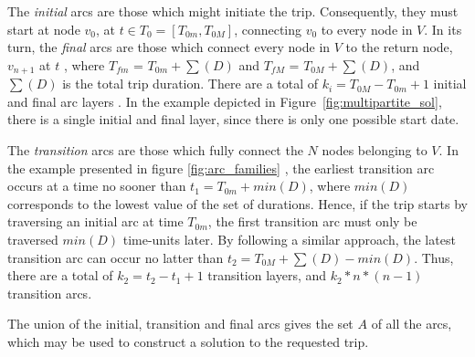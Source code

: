 The \textit{initial} arcs are those which might initiate the trip. Consequently,
they must start at node $v_0$, at $t \in T_0 = [T_{0m}, T_{0M}]$,
connecting $v_0$ to every node in $V$. In its turn, the \textit{final} arcs are those which connect every node in $V$ to
the return node, $v_{n+1}$ at $t$ \in [$T_{fm}$, $T_{fM}$], where $T_{fm}$ =
$T_{0m} + \sum(D)$ and $T_{fM}$ = $T_{0M} + \sum(D)$, and $\sum(D)$
is the total trip duration. There are a total of $k_i = T_{0M} -
T_{0m} + 1$ initial and final arc layers . In the example
depicted in Figure~\ref{fig:multipartite_sol}, there is a single initial and
final layer, since there is only one possible start date.

The \textit{transition} arcs are those which fully connect the $N$ nodes
belonging to $V$. In the example presented in figure \ref{fig:arc_families} , the earliest transition arc occurs at a time no sooner than
$t_1 = T_{0m} + min(D)$, where $min(D)$ corresponds to the lowest value of the
set of durations. Hence, if the trip starts by traversing an initial arc
at time $T_{0m}$, the first transition arc must only be traversed $min(D)$
time-units later. By following a similar approach, the latest transition arc can
occur no latter than $t_2 = T_{0M} + \sum(D) - min(D)$. Thus, there are a total
of $k_2 = t_2-t_1+1$ transition layers, and $k_2*n*(n-1)$ transition arcs.

The union of the initial, transition and final arcs gives the set $A$ of all the
arcs, which may be used to construct a solution to the requested trip. 


